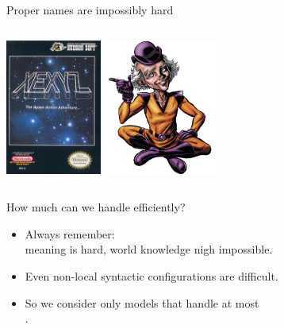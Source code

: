 \documentclass[professionalfonts, xcolor={usenames,svgnames,x11names,table}]{beamer}
\begin{document}
\begin{frame}{Proper names are impossibly hard}
    \begin{columns}
        \centering
        \includegraphics[height=12em]{./img/xexyz}
        \centering
        \includegraphics[height=12em]{./img/mxyzptlk}\\
    \end{columns}
\end{frame}

\begin{frame}{How much can we handle efficiently?}
    \begin{itemize}
        \item Always remember:\\
            meaning is hard, world knowledge nigh impossible.
        \item Even non-local syntactic configurations are difficult. 
        \item So we consider only models that handle at most\\
            .
    \end{itemize}
\end{frame}
\end{document}
